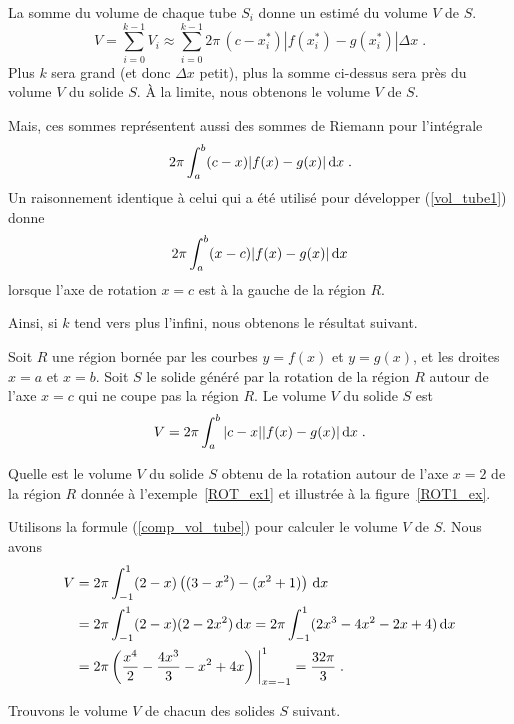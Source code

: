 {La somme du volume de chaque tube $S_i$ donne un estimé du volume $V$ de
$S$.
\[
V = \sum_{i=0}^{k-1} V_i \approx \sum_{i=0}^{k-1}
2 \pi \, (c-x_i^\ast) |f(x_i^\ast)-g(x_i^\ast)| \Delta x \; .
\]
Plus $k$ sera grand (et donc $\Delta x$ petit), plus la somme ci-dessus sera
près du volume $V$ du solide $S$.  À la limite, nous obtenons le volume $V$ de
$S$.

Mais, ces sommes représentent aussi des sommes de Riemann pour l'intégrale
\begin{equation}\label{vol_tube1}
2 \pi \int_a^b (c-x) |f(x)-g(x)| \,\mathrm{d}x \; .
\end{equation}
Un raisonnement identique à celui qui a été utilisé pour développer
(\ref{vol_tube1}) donne
\[
2 \pi \int_a^b (x-c) |f(x)-g(x)| \,\mathrm{d}x
\]
lorsque l'axe de rotation $x=c$ est à la gauche de la région $R$.

Ainsi, si $k$ tend vers plus l'infini, nous obtenons le résultat suivant.

\begin{focus}{\mth}
Soit $R$ une région bornée par les courbes $y=f(x)$ et $y=g(x)$, et les
droites $x=a$ et $x=b$.  Soit $S$ le solide généré par la rotation de la
région $R$ autour de l'axe $x=c$ qui ne coupe pas la région $R$. Le volume
$V$ du solide $S$ est
\begin{equation}\label{comp_vol_tube}
V = 2 \pi \int_a^b |c-x| |f(x)-g(x)| \,\mathrm{d}x \; .
\end{equation}
\end{focus}

\begin{egg}
Quelle est le volume $V$ du solide $S$ obtenu de la rotation autour de l'axe
$x=2$ de la région $R$ donnée à l'exemple~\ref{ROT_ex1} et illustrée à la
figure~\ref{ROT1_ex}.

Utilisons la formule (\ref{comp_vol_tube}) pour calculer
le volume $V$ de $S$.  Nous avons
\begin{align*}
V &= 2 \pi \int_{-1}^1 (2-x) \left( (3-x^2) - (x^2+1) \right)\,\mathrm{d}x \\
&= 2 \pi \int_{-1}^1 (2-x) (2 - 2x^2) \,\mathrm{d}x
= 2 \pi \int_{-1}^1 (2x^3-4x^2-2x+4) \,\mathrm{d}x \\
&= 2\pi \left( \frac{x^4}{2} - \frac{4x^3}{3} - x^2 +
4x \right)\bigg|_{x=-1}^1 = \frac{32\pi}{3} \; .
\end{align*}
\end{egg}

\begin{egg}
Trouvons le volume $V$ de chacun des solides $S$ suivant.


\end{egg}}
